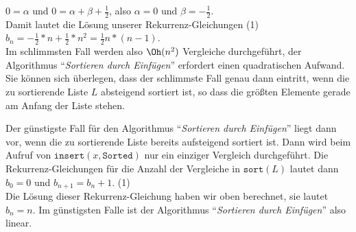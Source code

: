 \hspace*{1.3cm} $0 = \alpha$ \quad und \quad $\displaystyle 0 = \alpha + \beta + \frac{1}{2}$, \quad also \quad  $\alpha = 0$ \quad und \quad $\beta = - \frac{1}{2}$.  
\\[0.1cm]
Damit lautet die L\"osung unserer Rekurrenz-Gleichungen (1) \\[0.1cm]
\hspace*{1.3cm} 
$\displaystyle b_n = -\frac{1}{2} * n + \frac{1}{2} * n^2 = \frac{1}{2} n*(n-1)$. \\[0.1cm]
Im schlimmsten Fall werden also $\Oh(n^2)$ Vergleiche durchgef\"uhrt, der Algorithmus 
``\emph{Sortieren durch Einf\"ugen}'' erfordert einen quadratischen Aufwand.
Sie k\"onnen sich \"uberlegen, dass der schlimmste Fall genau dann eintritt, wenn die zu
sortierende Liste $L$ absteigend sortiert ist, so dass die gr\"o{\ss}ten Elemente gerade am
Anfang der Liste stehen.

Der g\"unstigste Fall f\"ur den Algorithmus ``\emph{Sortieren durch Einf\"ugen}'' liegt dann
vor, wenn die zu sortierende Liste bereits aufsteigend sortiert ist.  Dann wird beim
Aufruf von $\mathtt{insert}(x,\mathtt{Sorted})$ nur ein einziger Vergleich durchgef\"uhrt.
Die Rekurrenz-Gleichungen f\"ur die Anzahl der Vergleiche in $\mathtt{sort}(L)$ lautet dann \\[0.1cm]
\hspace*{1.3cm} $b_0 = 0$ \quad und \quad $b_{n+1} = b_n + 1$. \hspace*{\fill} (1)\\[0.1cm]
Die L\"osung dieser Rekurrenz-Gleichung haben wir oben berechnet, sie lautet $b_n = n$.
Im g\"unstigsten Falle ist der Algorithmus ``\emph{Sortieren durch Einf\"ugen}'' also linear.
\pagebreak

